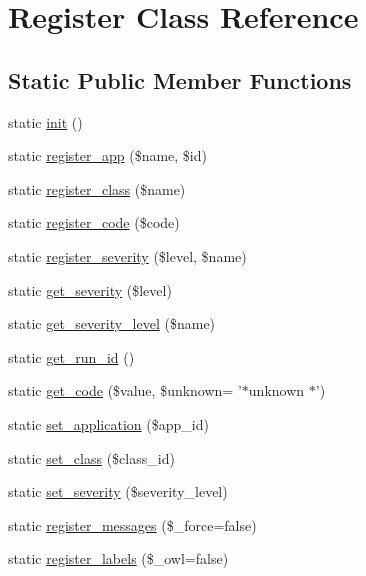 \section{Register Class Reference}
\label{classRegister}
\subsection*{Static Public Member Functions}
\begin{DoxyCompactItemize}
\item 
static \hyperlink{classRegister_a5c34c30e9e6ce4dea2dbb02f55e9278a}{init} ()
\item 
static \hyperlink{classRegister_ac547568c4a7272fdaf65cb2825eccec3}{register\_\-app} (\$name, \$id)
\item 
static \hyperlink{classRegister_a58300f74d002f1306a03baf12af0f02c}{register\_\-class} (\$name)
\item 
static \hyperlink{classRegister_a875fd1f32f0746aa9e0e00b053c7389a}{register\_\-code} (\$code)
\item 
static \hyperlink{classRegister_ac22a104eefa471675cb28ee20821eaad}{register\_\-severity} (\$level, \$name)
\item 
static \hyperlink{classRegister_ae71e10bddb03483b54ad22b9edb95b7c}{get\_\-severity} (\$level)
\item 
static \hyperlink{classRegister_a70490e59a4a3b910d259b8a4287c3e91}{get\_\-severity\_\-level} (\$name)
\item 
static \hyperlink{classRegister_a041706fafb409a31f125d2075501e82e}{get\_\-run\_\-id} ()
\item 
static \hyperlink{classRegister_abd8556b87ac48f8d8b3abeef6285c8f5}{get\_\-code} (\$value, \$unknown= '$\ast$unknown $\ast$')
\item 
static \hyperlink{classRegister_ad4d61787414f7d64d1e3420f0fdf3f91}{set\_\-application} (\$app\_\-id)
\item 
static \hyperlink{classRegister_a58e49ccb1fe4e441d0329e879c922aa0}{set\_\-class} (\$class\_\-id)
\item 
static \hyperlink{classRegister_a0adde8d67d77b9b4d66156272cb48ae4}{set\_\-severity} (\$severity\_\-level)
\item 
static \hyperlink{classRegister_a80be033f56d821cf6d271ffac2e2d387}{register\_\-messages} (\$\_\-force=false)
\item 
static \hyperlink{classRegister_ad145e4bc28af91817782399b06422e74}{register\_\-labels} (\$\_\-owl=false)
\end{DoxyCompactItemize}


